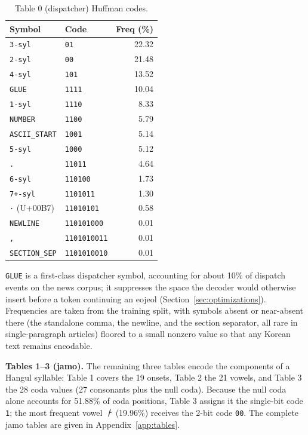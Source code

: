 \documentclass[conference]{IEEEtran}
\begin{document}
\begin{table}[H]
\centering
\caption{Table 0 (dispatcher) Huffman codes.}
\label{tab:t0}
\begin{tabular}{llr}
\toprule
Symbol & Code & Freq (\%) \\
\midrule
\texttt{3-syl}        & \texttt{01}         & 22.32 \\
\texttt{2-syl}        & \texttt{00}         & 21.48 \\
\texttt{4-syl}        & \texttt{101}        & 13.52 \\
\texttt{GLUE}         & \texttt{1111}       & 10.04 \\
\texttt{1-syl}        & \texttt{1110}       & 8.33 \\
\texttt{NUMBER}       & \texttt{1100}       & 5.79 \\
\texttt{ASCII\_START} & \texttt{1001}       & 5.14 \\
\texttt{5-syl}        & \texttt{1000}       & 5.12 \\
\texttt{.}            & \texttt{11011}      & 4.64 \\
\texttt{6-syl}        & \texttt{110100}     & 1.73 \\
\texttt{7+-syl}       & \texttt{1101011}    & 1.30 \\
\texttt{·} (U+00B7)   & \texttt{11010101}   & 0.58 \\
\texttt{NEWLINE}      & \texttt{110101000}  & 0.01 \\
\texttt{,}            & \texttt{1101010011} & 0.01 \\
\texttt{SECTION\_SEP} & \texttt{1101010010} & 0.01 \\
\bottomrule
\end{tabular}
\end{table}

\texttt{GLUE} is a first-class dispatcher symbol, accounting for about 10\% of
dispatch events on the news corpus; it suppresses the space the decoder would
otherwise insert before a token continuing an eojeol
(Section~\ref{sec:optimizations}). Frequencies are taken from the training
split, with symbols absent or near-absent there (the standalone comma, the
newline, and the section separator, all rare in single-paragraph articles)
floored to a small nonzero value so that any Korean text remains encodable.

\textbf{Tables 1--3 (jamo).} The remaining three tables encode the
components of a Hangul syllable: Table 1 covers the 19 onsets, Table 2 the
21 vowels, and Table 3 the 28 coda values (27 consonants plus the null
coda). Because the null coda alone accounts for 51.88\% of coda positions,
Table 3 assigns it the single-bit code \texttt{1}; the most frequent vowel
\emph{ㅏ} (19.96\%) receives the 2-bit code \texttt{00}. The complete jamo
tables are given in Appendix~\ref{app:tables}.
\end{document}
